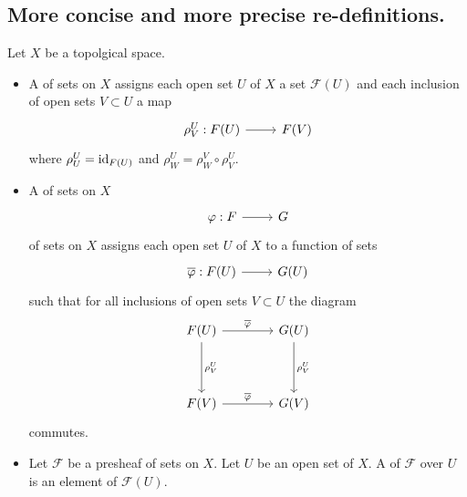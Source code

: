 \documentclass [11 pt, oneside] {article}
\begin{document}
\subsection{More concise and more precise re-definitions.}
\begin{definition}\label{}\text{}
Let $X$ be a topolgical space. 
\begin{itemize}
	\item A  of sets on $X$ assigns each open set $U$ of $X$ a set $\mathscr{F}(U)$ and each inclusion of open sets $V\subset U$ a map
\[
\begin{tikzcd}
	\rho_{V}^{U} : \mathscr{F}(U)\ar[r]&  \mathscr{F}(V)
\end{tikzcd}
\]
where $\rho_{U}^{U} = \operatorname{id}_{\relax{F}(U)}$ and $\rho_{W}^{U} = \rho_{W}^{V}\circ \rho_{V}^{U}$.

\item A  of sets on $X$ 
\[
\begin{tikzcd}
	\varphi:\mathscr{F}\ar[r]& \mathscr{G}
\end{tikzcd}
\]
of sets on $X$ assigns each open set $U$ of $X$ to a function of sets
\[
\begin{tikzcd}
	\overline{\varphi} : \mathscr{F}(U)\ar[r]&  \mathscr{G}(U)
\end{tikzcd}
\]
such that for all inclusions of open sets $V\subset U$ the diagram
\[
\begin{tikzcd}[sep = 4 em]
	\mathscr{F}(U)\ar[r,"\overline{\varphi}"] \ar[d,"\rho_{V}^{U}" ] & \mathscr{G}(U)\ar[d,"\rho_{V}^{U}" ]\\
	\mathscr{F}(V)\ar[r,"\overline{\varphi}"] &  \mathscr{G}(V)
\end{tikzcd}
\]
commutes.
\item Let $\mathscr{F}$ be a presheaf of sets on $X$. Let $U$ be an open set of $X$. A  of $\mathscr{F}$ over $U$ is an element of $\mathscr{F}(U)$.
\end{itemize}
\end{definition}
\end{document}
